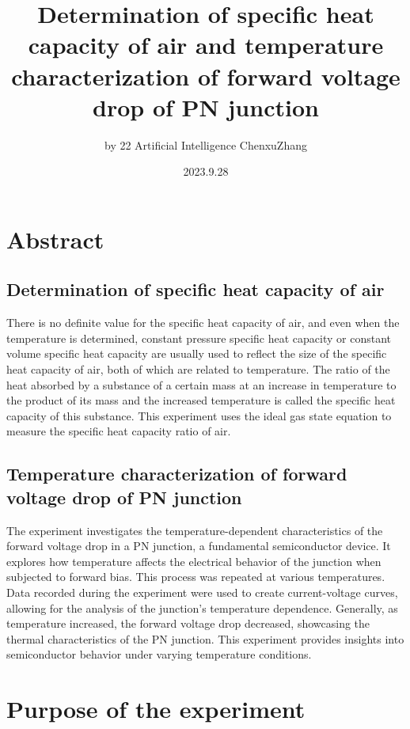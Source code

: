 \documentclass[UTF8]{article}
\title{Determination of specific heat capacity of air and temperature characterization of forward voltage drop of PN junction}
\author{by 22 Artificial Intelligence ChenxuZhang}
\date{2023.9.28}
\begin{document}
	
	\fancyfoot[C]{\thepage}
	
	\maketitle
	\tableofcontents
	\newpage
	
	\section{Abstract}
\subsection{Determination of specific heat capacity of air}
There is no definite value for the specific heat capacity of air, and even when the temperature is determined, constant pressure specific heat capacity or constant volume specific heat capacity are usually used to reflect the size of the specific heat capacity of air, both of which are related to temperature. The ratio of the heat absorbed by a substance of a certain mass at an increase in temperature to the product of its mass and the increased temperature is called the specific heat capacity of this substance. This experiment uses the ideal gas state equation to measure the specific heat capacity ratio of air.

 \subsection{Temperature characterization of forward voltage drop of PN junction}
The experiment investigates the temperature-dependent characteristics of the forward voltage drop in a PN junction, a fundamental semiconductor device. It explores how temperature affects the electrical behavior of the junction when subjected to forward bias. This process was repeated at various temperatures. Data recorded during the experiment were used to create current-voltage curves, allowing for the analysis of the junction's temperature dependence. Generally, as temperature increased, the forward voltage drop decreased, showcasing the thermal characteristics of the PN junction. This experiment provides insights into semiconductor behavior under varying temperature conditions.
	
\section{Purpose of the experiment}
\end{document}

